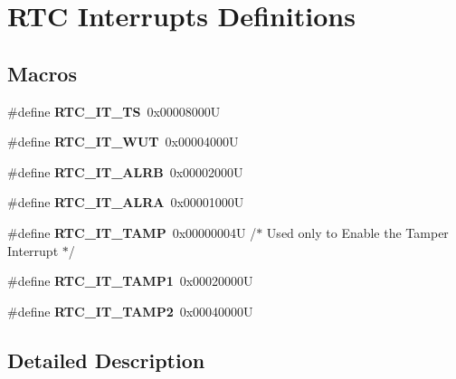 \hypertarget{group___r_t_c___interrupts___definitions}{}\section{R\+TC Interrupts Definitions}
\label{group___r_t_c___interrupts___definitions}
\subsection*{Macros}
\begin{DoxyCompactItemize}
\item 
\mbox{\label{group___r_t_c___interrupts___definitions_ga2c4632667c515e366a79df6341d5f3d1}} 
\#define {\bfseries R\+T\+C\+\_\+\+I\+T\+\_\+\+TS}~0x00008000U
\item 
\mbox{\label{group___r_t_c___interrupts___definitions_gadc90686ace99992f4775c0198a1c6591}} 
\#define {\bfseries R\+T\+C\+\_\+\+I\+T\+\_\+\+W\+UT}~0x00004000U
\item 
\mbox{\label{group___r_t_c___interrupts___definitions_gaeb47520af65e995ddad232f3a846aba8}} 
\#define {\bfseries R\+T\+C\+\_\+\+I\+T\+\_\+\+A\+L\+RB}~0x00002000U
\item 
\mbox{\label{group___r_t_c___interrupts___definitions_ga0ba352559e4eb6a5430e1254851a0dfb}} 
\#define {\bfseries R\+T\+C\+\_\+\+I\+T\+\_\+\+A\+L\+RA}~0x00001000U
\item 
\mbox{\label{group___r_t_c___interrupts___definitions_gada511402e0227932824cdc95711ebd55}} 
\#define {\bfseries R\+T\+C\+\_\+\+I\+T\+\_\+\+T\+A\+MP}~0x00000004\+U /$\ast$ Used only to Enable the Tamper Interrupt $\ast$/
\item 
\mbox{\label{group___r_t_c___interrupts___definitions_gaae1bc95e46b6951e45c4d857a6701a8a}} 
\#define {\bfseries R\+T\+C\+\_\+\+I\+T\+\_\+\+T\+A\+M\+P1}~0x00020000U
\item 
\mbox{\label{group___r_t_c___interrupts___definitions_ga0d3023d6f144f75848c246a033a01485}} 
\#define {\bfseries R\+T\+C\+\_\+\+I\+T\+\_\+\+T\+A\+M\+P2}~0x00040000U
\end{DoxyCompactItemize}


\subsection{Detailed Description}
